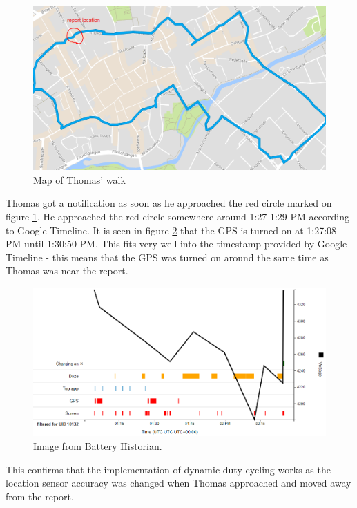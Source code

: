 \begin{figure}[H]
\centering
\includegraphics[width=\linewidth]{images/thomas_walk}
\caption{Map of Thomas' walk} 
\label{fig:thomas_walk}
\end{figure}


Thomas got a notification as soon as he approached the red circle marked on figure \ref{fig:thomas_walk}. He approached the red circle somewhere around 1:27-1:29 PM according to Google Timeline. It is seen in figure \ref{fig:battery_stats_1} that the GPS is turned on at 1:27:08 PM until 1:30:50 PM. This fits very well into the timestamp provided by Google Timeline - this means that the GPS was turned on around the same time as Thomas was near the report.

\begin{figure}[H]
\centering
\includegraphics[width=\linewidth]{images/battery_hist}
\caption{Image from Battery Historian.} 
\label{fig:battery_stats_1}
\end{figure}

This confirms that the implementation of dynamic duty cycling works as the location sensor accuracy was changed when Thomas approached and moved away from the report. 

